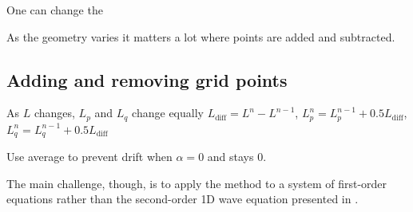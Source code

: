 One can change the 


As the geometry varies it matters a lot where points are added and subtracted. 


\subsection{Adding and removing grid points}
As $L$ changes, $L_p$ and $L_q$ change equally
$L_\text{diff} = L^n-L^{n-1}$, $L_p^n = L_p^{n-1} + 0.5 L_\text{diff}$, $L_q^n =  L_q^{n-1} + 0.5L_\text{diff}$

Use average to prevent drift when $\alpha = 0$ and stays 0.

The main challenge, though, is to apply the method to a system of first-order equations rather than the second-order 1D wave equation presented in \cite{Willemsen2021}. 
